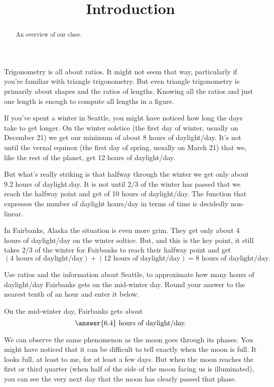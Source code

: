 \documentclass{ximera}
\title{Introduction}
\begin{document}
\begin{abstract}
An overview of our class.
\end{abstract}
\maketitle

Trigonometry is all about ratios. It might not seem that way, particularly if you're familiar with triangle trigonometry. But even triangle trigonometry is primarily about shapes and the ratios of lengths. Knowing all the ratios and just one length is enough to compute all lengths in a figure.

If you've spent a winter in Seattle, you might have noticed how long the days take to get longer. On the winter solstice (the first day of winter, usually on December 21) we get our minimum of about 8 hours of daylight/day. It's not until the vernal equinox
(the first day of spring, usually on March 21) that we, like the rest of the planet, get 12 hours of daylight/day.

But what's really striking is that halfway through the winter we get only about 9.2 hours of daylight.day. It is not until $2/3$ of the winter has passed that we reach the halfway point and get of 10 hours of daylight/day. The function that expresses the number of daylight hours/day in terms of time is decidedly non-linear.

In Fairbanks, Alaska the situation is even more grim. They get only about 4 hours of daylight/day on the winter soltice. But, and this is the key point, it still takes $2/3$ of the winter for Fairbanks to reach their halfway point and get
\[
  ( 4 \text{ hours of daylight/day}) + ( 12 \text{ hours of daylight/day}) =  8 \text{ hours of daylight/day}.
\]  

\begin{question} \label{Q1:Introduction}
Use ratios and the information about Seattle, to approximate how many hours of daylight/day Fairbanks gets on the mid-winter day. Round your answer to the nearest tenth of an hour and enter it below.

On the mid-winter day, Fairbanks gets about 
\[
    \answer{6.4} \text{ hours of daylight/day.}
\]
\end{question}

We can observe the same phenomenon as the moon goes through its phases. You might have noticed that it can be difficult to tell exactly when the moon is full. It looks full, at least to me, for at least a few days. But when the moon reaches the first or third quarter (when half of the side of the moon facing us is illuminated), you can see the very next day that the moon has clearly passed that phase.
\end{document}

